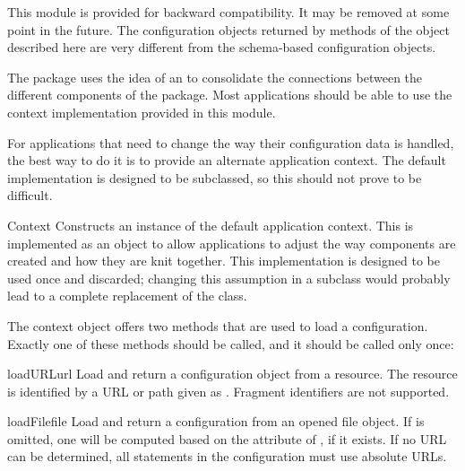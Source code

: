 \documentclass{howto}
\begin{document}

\begin{notice}[warning]
  This module is provided for backward compatibility.  It may be
  removed at some point in the future.  The configuration objects
  returned by methods of the  object described here are
  very different from the schema-based configuration objects.
\end{notice}

The  package uses the idea of an  to consolidate the connections between the different
components of the package.  Most applications should be able to use
the context implementation provided in this module.

For applications that need to change the way their configuration data
is handled, the best way to do it is to provide an alternate
application context.  The default implementation is designed to be
subclassed, so this should not prove to be difficult.

\begin{classdesc}{Context}{}
  Constructs an instance of the default application context.  This is
  implemented as an object to allow applications to adjust the way
  components are created and how they are knit together.  This
  implementation is designed to be used once and discarded; changing
  this assumption in a subclass would probably lead to a complete
  replacement of the class.
\end{classdesc}

The context object offers two methods that are used to load a
configuration.  Exactly one of these methods should be called, and it
should be called only once:

\begin{methoddesc}{loadURL}{url}
  Load and return a configuration object from a resource.  The
  resource is identified by a URL or path given as .
  Fragment identifiers are not supported.
\end{methoddesc}

\begin{methoddesc}{loadFile}{file}
  Load and return a configuration from an opened file object.
  If  is omitted, one will be computed based on the
   attribute of , if it exists.  If no URL can
  be determined, all  statements in the configuration
  must use absolute URLs.
\end{methoddesc}
\end{document}
